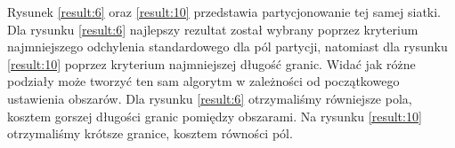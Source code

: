 Rysunek \ref{result:6} oraz \ref{result:10} przedstawia partycjonowanie tej samej siatki.
Dla rysunku \ref{result:6} najlepszy rezultat został wybrany poprzez kryterium najmniejszego odchylenia standardowego
dla pól partycji, natomiast dla rysunku \ref{result:10} poprzez kryterium najmniejszej długość granic.
Widać jak różne podziały może tworzyć ten sam algorytm w zależności od początkowego ustawienia obszarów.
Dla rysunku \ref{result:6} otrzymaliśmy równiejsze pola, kosztem gorszej długości granic pomiędzy obszarami.
Na rysunku \ref{result:10} otrzymaliśmy krótsze granice, kosztem równości pól.
\begin{figure}[h]
\centering
\begin{subfigure}{.33\textwidth}
    \centering
    \caption[short]{}
\end{subfigure}%
\begin{subfigure}{.33\textwidth}
    \centering

\end{subfigure}
\end{figure}
